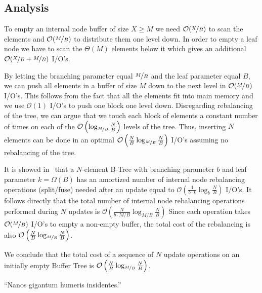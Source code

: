 \documentclass[twoside,11pt,openright]{report}
\begin{document}
\subsection{Analysis}
To empty an internal node buffer of size $X \geq M$ we need $\mathcal{O}(\nicefrac{X}{B})$ to scan the elements and $\mathcal{O}(\nicefrac{M}{B})$ to distribute them one level down. In order to empty a leaf node we have to scan the $\Theta(M)$ elements below it which gives an additional $\mathcal{O}(\nicefrac{X}{B} + \nicefrac{M}{B})$ I/O's.

By letting the branching parameter equal $\nicefrac{M}{B}$ and the leaf parameter equal $B$, we can push all elements in a buffer of size $M$ down to the next level in $\mathcal{O}(\nicefrac{M}{B})$ I/O's. This follows from the fact that all the elements fit into main memory and we use $\mathcal{O}(1)$ I/O's to push one block one level down. Disregarding rebalancing of the tree, we can argue that we touch each block of elements a constant number of times on each of the $\mathcal{O}\left(\log_{\nicefrac{M}{B}} \frac{N}{B}\right)$ levels of the tree. Thus, inserting $N$ elements can be done in an optimal $\mathcal{O}\left(\frac{N}{B} \log_{\nicefrac{M}{B}} \frac{N}{B}\right)$ I/O's  assuming no rebalancing of the tree.

It is showed in~\cite{ionote} that a $N$-element B-Tree with branching parameter $b$ and leaf parameter $k = \Omega(B)$ has an amortized number of internal node rebalancing operations (split/fuse) needed after an update equal to $\mathcal{O}\left(\frac{1}{b \cdot k}\log_b \frac{N}{B}\right)$ I/O's. It follows directly that the total number of internal node rebalancing operations performed during $N$ updates is $\mathcal{O}\left(\frac{N}{b \cdot M/B}\log_{M/B} \frac{N}{B}\right)$ Since each operation takes $\mathcal{O}(\nicefrac{M}{B})$ I/O's to empty a non-empty buffer, the total cost of the rebalancing is also $\mathcal{O}\left(\frac{N}{B} \log_{\nicefrac{M}{B}} \frac{N}{B}\right)$.

We conclude that the total cost of a sequence of $N$ update operations on an initially empty Buffer Tree is $\mathcal{O}\left(\frac{N}{B} \log_{\nicefrac{M}{B}} \frac{N}{B}\right)$.


\begin{savequote}[0.5\textwidth]
``Nanos gigantum humeris insidentes.''
\end{savequote}
\end{document}

